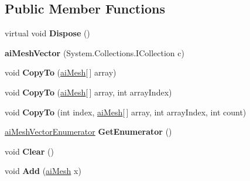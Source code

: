 \subsection*{Public Member Functions}
\begin{DoxyCompactItemize}
\item 
\hypertarget{classai_mesh_vector_a07cda514511996f5c4d6e44ecbdb61ed}{virtual void {\bfseries Dispose} ()}\label{classai_mesh_vector_a07cda514511996f5c4d6e44ecbdb61ed}

\item 
\hypertarget{classai_mesh_vector_ac8fe003304296313adf9aa9a51a290c3}{{\bfseries ai\+Mesh\+Vector} (System.\+Collections.\+I\+Collection c)}\label{classai_mesh_vector_ac8fe003304296313adf9aa9a51a290c3}

\item 
\hypertarget{classai_mesh_vector_ac03a041625b121cd2bbdfd3f03bd9db8}{void {\bfseries Copy\+To} (\hyperlink{structai_mesh}{ai\+Mesh}\mbox{[}$\,$\mbox{]} array)}\label{classai_mesh_vector_ac03a041625b121cd2bbdfd3f03bd9db8}

\item 
\hypertarget{classai_mesh_vector_a7eb1ad3f0277d905e1758a17c64cb992}{void {\bfseries Copy\+To} (\hyperlink{structai_mesh}{ai\+Mesh}\mbox{[}$\,$\mbox{]} array, int array\+Index)}\label{classai_mesh_vector_a7eb1ad3f0277d905e1758a17c64cb992}

\item 
\hypertarget{classai_mesh_vector_a3350bc781c6c17b9de9ae61d3e3f7a16}{void {\bfseries Copy\+To} (int index, \hyperlink{structai_mesh}{ai\+Mesh}\mbox{[}$\,$\mbox{]} array, int array\+Index, int count)}\label{classai_mesh_vector_a3350bc781c6c17b9de9ae61d3e3f7a16}

\item 
\hypertarget{classai_mesh_vector_a884b8e532a8ef219eccff717aeaf3764}{\hyperlink{classai_mesh_vector_1_1ai_mesh_vector_enumerator}{ai\+Mesh\+Vector\+Enumerator} {\bfseries Get\+Enumerator} ()}\label{classai_mesh_vector_a884b8e532a8ef219eccff717aeaf3764}

\item 
\hypertarget{classai_mesh_vector_a907a6ea5da589700cc16c8dd9d68316f}{void {\bfseries Clear} ()}\label{classai_mesh_vector_a907a6ea5da589700cc16c8dd9d68316f}

\item 
\hypertarget{classai_mesh_vector_a20c1fbf838927abf5de4cbf081363791}{void {\bfseries Add} (\hyperlink{structai_mesh}{ai\+Mesh} x)}\label{classai_mesh_vector_a20c1fbf838927abf5de4cbf081363791}


\end{DoxyCompactItemize}
